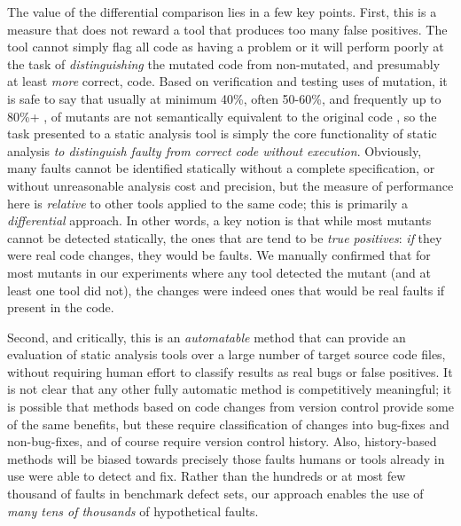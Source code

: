 The value of the differential comparison lies in a few key points.  First, this is a measure that does not reward a tool that produces too many false positives.  The tool cannot simply flag all code as having a problem or it will perform poorly at the task of \emph{distinguishing} the mutated code from non-mutated, and presumably at least \emph{more} correct, code.  Based on verification and testing uses of mutation, it is safe to say that usually at minimum 40\%, often 50-60\%, and frequently up to 80\%+ \cite{mutKernel,groce2018verified,le2014mucheck}, of mutants are not semantically equivalent to the original code \cite{TCE,impactEquiv,smith2009should}, so the task presented to a static analysis tool is simply the core functionality of static analysis \emph{to distinguish faulty from correct code without execution}.  Obviously, many faults cannot be identified statically without a complete specification, or without unreasonable analysis cost and precision, but the measure of performance here is \emph{relative} to other tools applied to the same code; this is primarily a \emph{differential} approach.  In other words, a key notion is that while most mutants cannot be detected statically, the ones that are tend to be \emph{true positives}: \emph{if} they were real code changes, they would be faults.  We manually confirmed that for most mutants in our experiments where any tool detected the mutant (and at least one tool did not), the changes were indeed ones that would be real faults if present in the code.

Second, and critically, this is an \emph{automatable} method that can provide an evaluation of static analysis tools over a large number of target source code files, without requiring human effort to classify results as real bugs or false positives.  It is not clear that any other fully automatic method is competitively meaningful; it is possible that methods based on code changes from version control provide some of the same benefits, but these require classification of changes into bug-fixes and non-bug-fixes, and of course require version control history.  Also, history-based methods will be biased towards precisely those faults humans or tools already in use were able to detect and fix.  Rather than the hundreds \cite{just2014defects4j} or at most few thousand of faults \cite{BugSwarm} in benchmark defect sets, our approach enables the use of \emph{many tens of thousands} of hypothetical faults.

